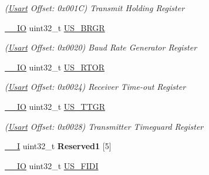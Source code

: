 \begin{DoxyCompactItemize}
\begin{DoxyCompactList}\small\item\em (\mbox{\hyperlink{structUsart}{Usart}} Offset\+: 0x001C) Transmit Holding Register \end{DoxyCompactList}\item 
\mbox{\label{structUsart_ab9e7c76fad7dab06225a4d134582f3b4}} 
\mbox{\hyperlink{core__cm7_8h_aec43007d9998a0a0e01faede4133d6be}{\+\_\+\+\_\+\+IO}} uint32\+\_\+t \mbox{\hyperlink{structUsart_ab9e7c76fad7dab06225a4d134582f3b4}{U\+S\+\_\+\+B\+R\+GR}}
\begin{DoxyCompactList}\small\item\em (\mbox{\hyperlink{structUsart}{Usart}} Offset\+: 0x0020) Baud Rate Generator Register \end{DoxyCompactList}\item 
\mbox{\label{structUsart_a379a01b93548081163fb16fe23ca0792}} 
\mbox{\hyperlink{core__cm7_8h_aec43007d9998a0a0e01faede4133d6be}{\+\_\+\+\_\+\+IO}} uint32\+\_\+t \mbox{\hyperlink{structUsart_a379a01b93548081163fb16fe23ca0792}{U\+S\+\_\+\+R\+T\+OR}}
\begin{DoxyCompactList}\small\item\em (\mbox{\hyperlink{structUsart}{Usart}} Offset\+: 0x0024) Receiver Time-\/out Register \end{DoxyCompactList}\item 
\mbox{\label{structUsart_a5498a19b7808fbb304a907813f00ab28}} 
\mbox{\hyperlink{core__cm7_8h_aec43007d9998a0a0e01faede4133d6be}{\+\_\+\+\_\+\+IO}} uint32\+\_\+t \mbox{\hyperlink{structUsart_a5498a19b7808fbb304a907813f00ab28}{U\+S\+\_\+\+T\+T\+GR}}
\begin{DoxyCompactList}\small\item\em (\mbox{\hyperlink{structUsart}{Usart}} Offset\+: 0x0028) Transmitter Timeguard Register \end{DoxyCompactList}\item 
\mbox{\label{structUsart_a94b45d8c1f38f5fc07b9991946d55c3b}} 
\mbox{\hyperlink{core__cm7_8h_af63697ed9952cc71e1225efe205f6cd3}{\+\_\+\+\_\+I}} uint32\+\_\+t {\bfseries Reserved1} \mbox{[}5\mbox{]}
\item 
\mbox{\label{structUsart_a3585671f3f60e19a816fdd0714ca64a7}} 
\mbox{\hyperlink{core__cm7_8h_aec43007d9998a0a0e01faede4133d6be}{\+\_\+\+\_\+\+IO}} uint32\+\_\+t \mbox{\hyperlink{structUsart_a3585671f3f60e19a816fdd0714ca64a7}{U\+S\+\_\+\+F\+I\+DI}}

\end{DoxyCompactItemize}
